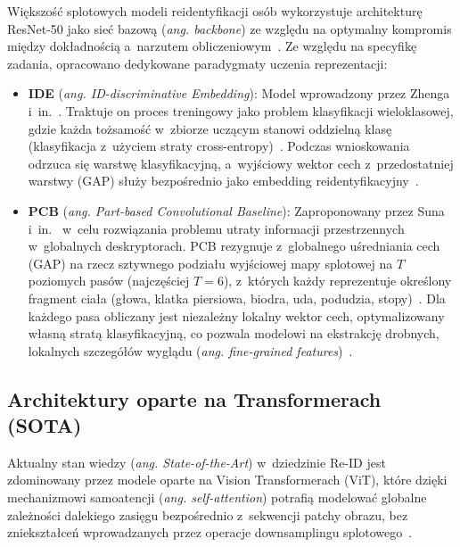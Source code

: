 Większość splotowych modeli reidentyfikacji osób wykorzystuje architekturę ResNet-50 jako sieć
bazową (\textit{ang. backbone}) ze względu na optymalny kompromis między dokładnością a~narzutem
obliczeniowym~\cite{ristani2016, zheng2016person}. Ze względu na specyfikę zadania, opracowano
dedykowane paradygmaty uczenia reprezentacji:
\begin{itemize}
  \item \textbf{IDE} (\textit{ang. ID-discriminative Embedding}): Model wprowadzony przez Zhenga i~in.~\cite{zheng2017person_wild}. Traktuje on proces treningowy jako problem klasyfikacji wieloklasowej, gdzie każda tożsamość w~zbiorze uczącym stanowi oddzielną klasę (klasyfikacja z~użyciem straty cross-entropy)~\cite{zheng2017person_wild}. Podczas wnioskowania odrzuca się warstwę klasyfikacyjną, a~wyjściowy wektor cech z~przedostatniej warstwy (GAP) służy bezpośrednio jako embedding reidentyfikacyjny~\cite{zheng2017person_wild}.
  \item \textbf{PCB} (\textit{ang. Part-based Convolutional Baseline}): Zaproponowany przez Suna i~in.~\cite{sun2018beyond} w~celu rozwiązania problemu utraty informacji przestrzennych w~globalnych deskryptorach. PCB rezygnuje z~globalnego uśredniania cech (GAP) na rzecz sztywnego podziału wyjściowej mapy splotowej na $T$ poziomych pasów (najczęściej $T=6$), z~których każdy reprezentuje określony fragment ciała (głowa, klatka piersiowa, biodra, uda, podudzia, stopy)~\cite{sun2018beyond}. Dla każdego pasa obliczany jest niezależny lokalny wektor cech, optymalizowany własną stratą klasyfikacyjną, co pozwala modelowi na ekstrakcję drobnych, lokalnych szczegółów wyglądu (\textit{ang. fine-grained features})~\cite{sun2018beyond}.
\end{itemize}

\subsection{Architektury oparte na Transformerach (SOTA)}
\label{subsec:transformers_reid}

Aktualny stan wiedzy (\textit{ang. State-of-the-Art}) w~dziedzinie Re-ID jest zdominowany przez
modele oparte na Vision Transformerach (ViT), które dzięki mechanizmowi samoatencji (\textit{ang.
  self-attention}) potrafią modelować globalne zależności dalekiego zasięgu bezpośrednio z~sekwencji
patchy obrazu, bez zniekształceń wprowadzanych przez operacje downsamplingu
splotowego~\cite{he2021transreid}.


